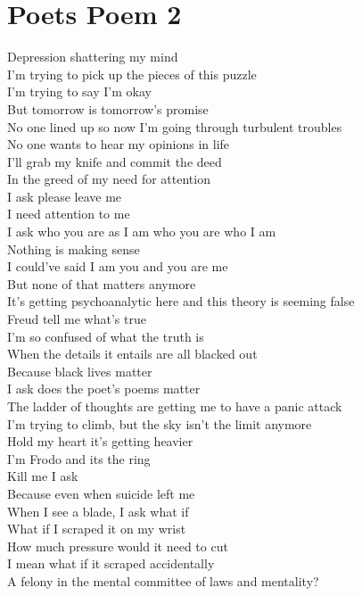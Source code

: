 \documentclass[12pt, b5paper, oneside]{book}
\begin{document}
\section{Poets Poem 2}
Depression shattering my mind
\\I'm trying to pick up the pieces of this puzzle
\\I'm trying to say I'm okay
\\But tomorrow is tomorrow's promise
\\No one lined up so now I'm going through turbulent troubles
\\No one wants to hear my opinions in life
\\I'll grab my knife and commit the deed
\\In the greed of my need for attention
\\I ask please leave me
\\I need attention to me
\\I ask who you are as I am who you are who I am
\\Nothing is making sense
\\I could've said I am you and you are me
\\But none of that matters anymore
\\It's getting psychoanalytic here and this theory is seeming false
\\Freud tell me what's true
\\I'm so confused of what the truth is
\\When the details it entails are all blacked out
\\Because black lives matter
\\I ask does the poet's poems matter
\\The ladder of thoughts are getting me to have a panic attack
\\I'm trying to climb, but the sky isn't the limit anymore 
\\Hold my heart it's getting heavier
\\I'm Frodo and its the ring
\\Kill me I ask
\\Because even when suicide left me
\\When I see a blade, I ask what if
\\What if I scraped it on my wrist
\\How much pressure would it need to cut
\\I mean what if it scraped accidentally
\\A felony in the mental committee of laws and mentality?
\end{document}
